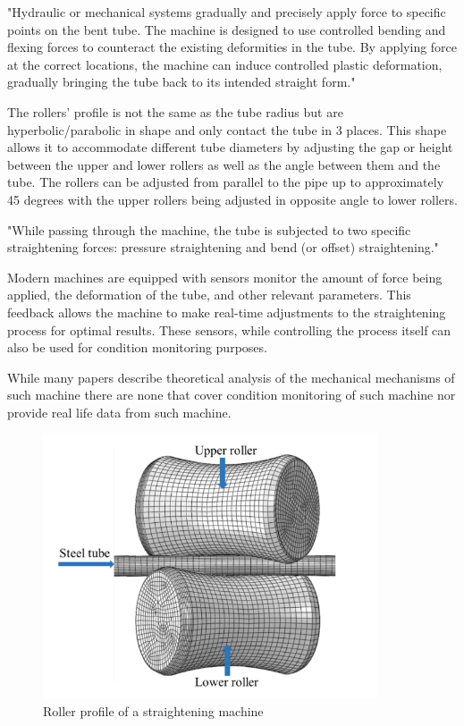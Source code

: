 \documentclass[]{article}
\begin{document}
"Hydraulic or mechanical systems gradually and precisely apply force to specific points on the bent tube. The machine is designed to use controlled bending and flexing forces to counteract the existing deformities in the tube. By applying force at the correct locations, the machine can induce controlled plastic deformation, gradually bringing the tube back to its intended straight form."

The rollers' profile is not the same as the tube radius but are hyperbolic/parabolic in shape and only contact the tube in 3 places. This shape allows it to accommodate different tube diameters by adjusting the gap or height between the upper and lower rollers as well as the angle between them and the tube. The rollers can be adjusted from parallel to the pipe up to approximately 45 degrees with the upper rollers being adjusted in opposite angle to lower rollers.

"While passing through the machine, the tube is subjected to two specific straightening forces: pressure straightening and bend (or offset) straightening."

Modern machines are equipped with sensors monitor the amount of force being applied, the deformation of the tube, and other relevant parameters. This feedback allows the machine to make real-time adjustments to the straightening process for optimal results. These sensors, while controlling the process itself can also be used for condition monitoring purposes.

While many papers describe theoretical analysis of the mechanical mechanisms of such machine there are none that cover condition monitoring of such machine nor provide real life data from such machine.

\begin{figure}[H]
	\centering
	\includegraphics[width=\textwidth]{straightening2.png}
	\caption{Roller profile of a straightening machine~\cite{ma2020effect}}
	\label{straighteningImage2}
\end{figure}
\end{document}
